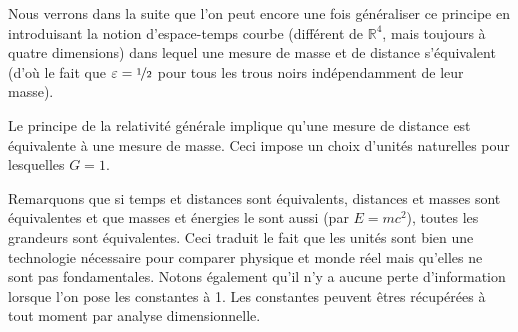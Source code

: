         Nous verrons dans la suite que l'on peut encore une fois généraliser ce principe en introduisant la notion d'espace-temps courbe (différent de $\mathbb{R}^4$, mais toujours à quatre dimensions) dans lequel une mesure de masse et de distance s'équivalent (d'où le fait que $\varepsilon = \nicefrac{1}{2}$ pour tous les trous noirs indépendamment de leur masse).
        
        \begin{leftbar}
            Le principe de la relativité générale implique qu'une mesure de distance est équivalente à une mesure de masse. Ceci impose un choix d'unités naturelles pour lesquelles $G = 1$.
        \end{leftbar}
        
        Remarquons que si temps et distances sont équivalents, distances et masses sont équivalentes et que masses et énergies le sont aussi (par $E = mc^2$), toutes les grandeurs sont équivalentes. Ceci traduit le fait que les unités sont bien une technologie nécessaire pour comparer physique et monde réel mais qu'elles ne sont pas fondamentales. Notons également qu'il n'y a aucune perte d'information lorsque l'on pose les constantes à 1. Les constantes peuvent êtres récupérées à tout moment par analyse dimensionnelle.